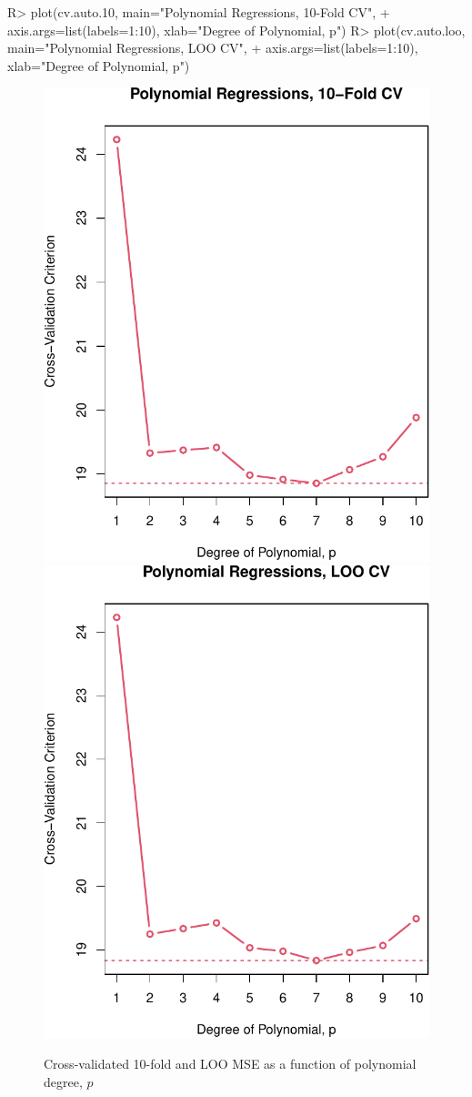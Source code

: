 \documentclass[
]{jss}
\begin{document}
\begin{CodeChunk}
\begin{CodeInput}
R> plot(cv.auto.10, main="Polynomial Regressions, 10-Fold CV",
+      axis.args=list(labels=1:10), xlab="Degree of Polynomial, p")
R> plot(cv.auto.loo, main="Polynomial Regressions, LOO CV",
+      axis.args=list(labels=1:10), xlab="Degree of Polynomial, p")
\end{CodeInput}
\begin{figure}

{\centering \includegraphics[width=0.45\linewidth]{JSS-article-reduced_files/figure-latex/polynomial-regression-CV-graph-2-1} \includegraphics[width=0.45\linewidth]{JSS-article-reduced_files/figure-latex/polynomial-regression-CV-graph-2-2} 

}

\caption[Cross-validated 10-fold and LOO MSE as a function of polynomial degree, $p$]{Cross-validated 10-fold and LOO MSE as a function of polynomial degree, $p$}\label{fig:polynomial-regression-CV-graph-2}
\end{figure}
\end{CodeChunk}
\end{document}
